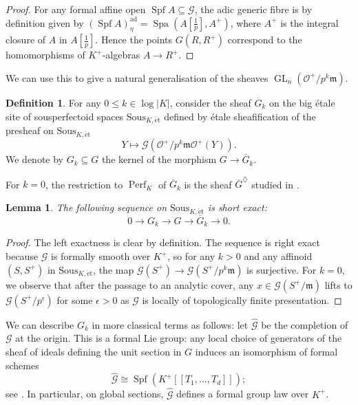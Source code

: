 \documentclass[11pt]{amsart}
\numberwithin{equation}{section}
\newtheorem{Lemma}[thm]{Lemma}
\theoremstyle{definition}
\newtheorem{Definition}[thm]{Definition}
\theoremstyle{remark}
\newcommand{\lra}{\longrightarrow}
\newcommand{\wh}{\widehat}
\renewcommand{\O}{\mathcal{O}}
\newcommand{\m}{\mathfrak{m}}
\newcommand{\GL}{\operatorname{GL}}
\newcommand{\Perf}{\operatorname{Perf}}
\newcommand{\Spa}{\operatorname{Spa}}
\newcommand{\et}{{\operatorname{\acute{e}t}}}
\newcommand{\tf}{[\tfrac{1}{p}]}
\newcommand{\ad}{\mathrm{ad}}
\newcommand{\Spf}{\operatorname{Spf}}
\newcommand{\mG}{\mathcal{G}}
\newcommand{\Sous}{\mathrm{Sous}}
\begin{document}
\begin{proof}
	For any formal affine open $\Spf A\subseteq \mG$, the adic generic fibre is by definition given by $(\Spf A)^{\ad}_{\eta}=\Spa(A\tf,A^+)$, where $A^+$ is the integral closure of $A$ in $A\tf$. Hence the points $G(R,R^+)$ correspond to the homomorphisms of $K^+$-algebras $A\to R^+$.
\end{proof}

We can use this to give a natural generalisation of the sheaves $\GL_n(\O^+/p^k\m)$. 

\begin{Definition}
	For any $0\leq k\in \log|K|$, consider the  sheaf $\overline G_{k}$ on the big \'etale site of sousperfectoid spaces $\mathrm{Sous}_{K,\et}$ defined by \'etale sheafification of the presheaf on $\Sous_{K,\et}$
		\[ Y\longmapsto \mG\left(\O^+/p^k\m\O^+(Y)\right).\]
	We denote by $G_{k}\subseteq G$ the kernel of the morphism $G\to \overline G_{k}$.
\end{Definition}

For $k=0$, the restriction to $\Perf_K$  of $\overline G_{k}$ is the sheaf $\overline G^\diamondsuit$ studied in \cite[Section~5]{heuer-Picard-good-reduction}. 

\begin{Lemma}\label{l:ses-of-G_k}
	The following sequence on $\Sous_{K,\et}$ is short exact:
	\[ 0\lra G_k\lra G\lra \overline G_{k}\lra 0.\]
\end{Lemma}

\begin{proof}
	The left exactness is clear by definition. The sequence is right exact because $\mG$ is formally smooth over $K^+$, so for any $k>0$ and any affinoid $(S,S^+)$ in $\Sous_{K,\et}$, the map $\mG(S^+ )\to \mG(S^+/p^k\m)$ is surjective. For $k=0$, we observe that after the passage to an analytic cover, any $x\in \mG(S^+/\m)$ lifts to $\mG(S^+/p^{\epsilon})$ for some $\epsilon>0$ as $\mG$ is locally of topologically finite presentation.
\end{proof}

We can describe $G_k$ in more classical terms as follows: let $\wh{\mathcal G}$ be the completion of $\mathcal G$ at the origin. This is a formal Lie group: any local choice of generators of the sheaf of ideals defining the unit section in $G$ induces an isomorphism of formal schemes
\[\wh{\mathcal G}\cong \Spf(K^+[[T_1,\dots,T_d]]);\]
see \cite[Chapter II,  pp.~25--26]{MessingCrystals}. 
In particular, on global sections, $\wh{\mathcal G}$ defines a formal group law over $K^+$.
\end{document}
